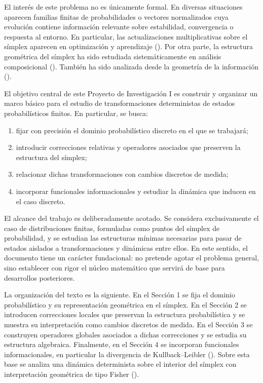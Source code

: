 \documentclass[12pt]{article}
\begin{document}
El interés de este problema no es únicamente formal. En diversas situaciones aparecen familias finitas de probabilidades o vectores normalizados cuya evolución contiene información relevante sobre estabilidad, convergencia o respuesta al entorno. En particular, las actualizaciones multiplicativas sobre el símplex aparecen en optimización y aprendizaje (\cite{KivinenWarmuth1997}). Por otra parte, la estructura geométrica del símplex ha sido estudiada sistemáticamente en análisis composicional (\cite{Aitchison1986}). También ha sido analizada desde la geometría de la información (\cite{AmariNagaoka2000}).

El objetivo central de este Proyecto de Investigación I es construir y organizar un marco básico para el estudio de transformaciones deterministas de estados probabilísticos finitos. En particular, se busca:
\begin{enumerate}
    \item fijar con precisión el dominio probabilístico discreto en el que se trabajará;
    \item introducir correcciones relativas y operadores asociados que preserven la estructura del símplex;
    \item relacionar dichas transformaciones con cambios discretos de medida;
    \item incorporar funcionales informacionales y estudiar la dinámica que inducen en el caso discreto.
\end{enumerate}

El alcance del trabajo es deliberadamente acotado. Se considera exclusivamente el caso de distribuciones finitas, formuladas como puntos del símplex de probabilidad, y se estudian las estructuras mínimas necesarias para pasar de estados aislados a transformaciones y dinámicas entre ellos. En este sentido, el documento tiene un carácter fundacional: no pretende agotar el problema general, sino establecer con rigor el núcleo matemático que servirá de base para desarrollos posteriores.

La organización del texto es la siguiente. En el Sección 1 se fija el dominio probabilístico y su representación geométrica en el símplex. En el Sección 2 se introducen correcciones locales que preservan la estructura probabilística y se muestra su interpretación como cambios discretos de medida. En el Sección 3 se construyen operadores globales asociados a dichas correcciones y se estudia su estructura algebraica. Finalmente, en el Sección 4 se incorporan funcionales informacionales, en particular la divergencia de Kullback--Leibler (\cite{KullbackLeibler1951}). Sobre esta base se analiza una dinámica determinista sobre el interior del símplex con interpretación geométrica de tipo Fisher (\cite{Amari2016}).
\end{document}
